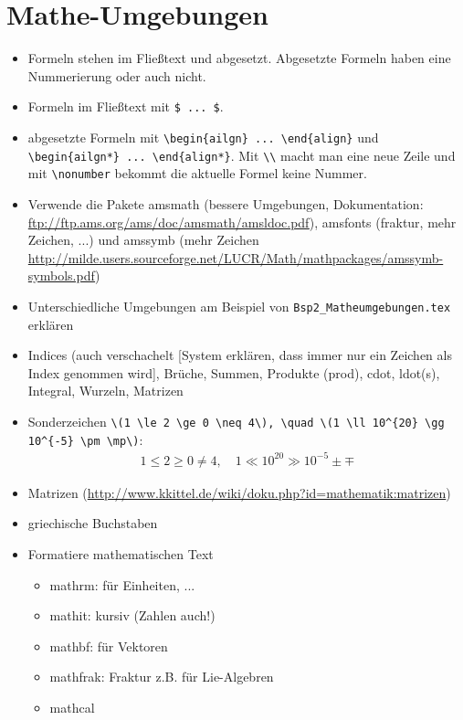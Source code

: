 \documentclass[11pt,a4paper]{scrartcl}
\begin{document}
\section{Mathe-Umgebungen}
\begin{itemize}
\item Formeln stehen im Fließtext und abgesetzt. Abgesetzte Formeln haben eine Nummerierung oder auch nicht.
\item Formeln im Fließtext mit \verb|$ ... $|.
\item abgesetzte Formeln mit \verb|\begin{ailgn} ... \end{align}| und \verb|\begin{ailgn*} ... \end{align*}|. Mit \verb|\\| macht man eine neue Zeile und mit \verb|\nonumber| bekommt die aktuelle Formel keine Nummer.
\item Verwende die Pakete amsmath (bessere Umgebungen, Dokumentation: \url{ftp://ftp.ams.org/ams/doc/amsmath/amsldoc.pdf}), amsfonts (fraktur, mehr Zeichen, ...) und amssymb (mehr Zeichen \url{http://milde.users.sourceforge.net/LUCR/Math/mathpackages/amssymb-symbols.pdf})
\item Unterschiedliche Umgebungen am Beispiel von \verb|Bsp2_Matheumgebungen.tex| erklären
\item Indices (auch verschachelt [System erklären, dass immer nur ein Zeichen als Index genommen wird], Brüche, Summen, Produkte (prod), cdot, ldot(s), Integral, Wurzeln, Matrizen
\item Sonderzeichen \verb|\(1 \le 2 \ge 0 \neq 4\), \quad \(1 \ll 10^{20} \gg 10^{-5} \pm \mp\)|:
  \begin{align*}
  1 \le 2 \ge 0 \neq 4, \quad 1 \ll 10^{20} \gg 10^{-5} \pm \mp
  \end{align*}
\item Matrizen (\url{http://www.kkittel.de/wiki/doku.php?id=mathematik:matrizen})
\item griechische Buchstaben
\item Formatiere mathematischen Text
  \begin{itemize}
  \item mathrm: für Einheiten, ...
  \item mathit: kursiv (Zahlen auch!)
  \item mathbf: für Vektoren
  \item mathfrak: Fraktur z.B. für Lie-Algebren
  \item mathcal

\end{itemize}
\end{itemize}
\end{document}
